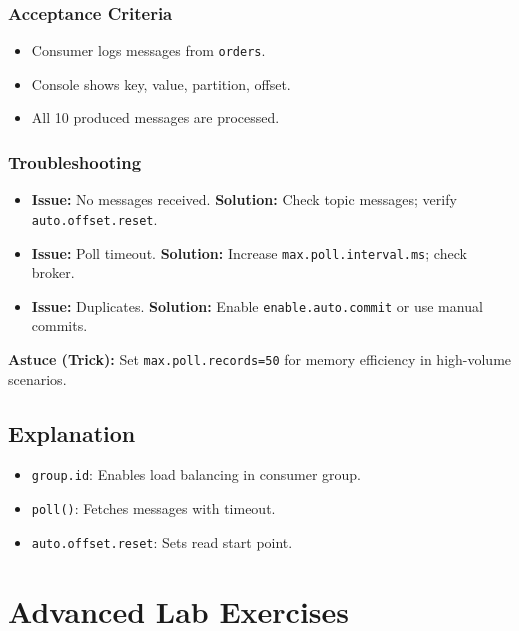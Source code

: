 \documentclass[12pt,a4paper]{report}
\begin{document}
\subsection{Acceptance Criteria}
\begin{itemize}
    \item Consumer logs messages from \texttt{orders}.
    \item Console shows key, value, partition, offset.
    \item All 10 produced messages are processed.
\end{itemize}

\subsection{Troubleshooting}
\begin{itemize}
    \item \textbf{Issue:} No messages received.
      \textbf{Solution:} Check topic messages; verify \texttt{auto.offset.reset}.
    \item \textbf{Issue:} Poll timeout.
      \textbf{Solution:} Increase \texttt{max.poll.interval.ms}; check broker.
    \item \textbf{Issue:} Duplicates.
      \textbf{Solution:} Enable \texttt{enable.auto.commit} or use manual commits.
\end{itemize}

\begin{framed}
\textbf{Astuce (Trick):} Set \texttt{max.poll.records=50} for memory efficiency in high-volume scenarios.
\end{framed}

\section{Explanation}
\begin{itemize}
    \item \texttt{group.id}: Enables load balancing in consumer group.
    \item \texttt{poll()}: Fetches messages with timeout.
    \item \texttt{auto.offset.reset}: Sets read start point.
\end{itemize}

\chapter{Advanced Lab Exercises}
\end{document}
